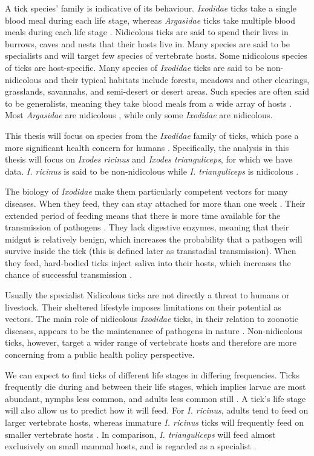 \documentclass{article}
\begin{document}
A tick species' family is indicative of its behaviour. \textit{Ixodidae} ticks take a single blood meal during each life stage, whereas \textit{Argasidae} ticks take multiple blood meals during each life stage \cite{Johnson2023d}. Nidicolous ticks are said to spend their lives in burrows, caves and nests that their hosts live in. Many species are said to be specialists and will target few species of vertebrate hosts. Some nidicolous species of ticks are host-specific. Many species of \textit{Ixodidae} ticks are said to be non-nidicolous and their typical habitats include forests, meadows and other clearings, grasslands, savannahs, and semi-desert or desert areas. Such species are often said to be generalists, meaning they take blood meals from a wide array of hosts \cite{Nicholson2019}. Most \textit{Argasidae} are nidicolous \cite{Vial2009}, while only some \textit{Ixodidae} are nidicolous. 

This thesis will focus on species from the \textit{Ixodidae} family of ticks, which pose a more significant health concern for humans \cite{Parola2001}. Specifically, the analysis in this thesis will focus on \textit{Ixodes ricinus} and \textit{Ixodes trianguliceps}, for which we have data. \textit{I. ricinus} is said to be non-nidicolous while \textit{I. trianguliceps} is nidicolous \cite{Nicholson2019}.

The biology of \textit{Ixodidae} make them particularly competent vectors for many diseases. When they feed, they can stay attached for more than one week \cite{Johnson2023b}. Their extended period of feeding means that there is more time available for the transmission of pathogens \cite{Gray2024}. They lack digestive enzymes, meaning that their midgut is relatively benign, which increases the probability that a pathogen will survive inside the tick (this is defined later as transtadial transmission). When they feed, hard-bodied ticks inject saliva into their hosts, which increases the chance of successful transmission \cite{Gray2024}.

Usually the specialist Nidicolous ticks are not directly a threat to humans or livestock. Their sheltered lifestyle imposes limitations on their potential as vectors. The main role of nidicolous \textit{Ixodidae} ticks, in their relation to zoonotic diseases, appears to be the maintenance of pathogens in nature \cite{gray2014}. Non-nidicolous ticks, however, target a wider range of vertebrate hosts and therefore are more concerning from a public health policy perspective.

We can expect to find ticks of different life stages in differing frequencies. Ticks frequently die during and between their life stages, which implies larvae are most abundant, nymphs less common, and adults less common still \cite{Randolph1998}. A tick's life stage will also allow us to predict how it will feed. For \textit{I. ricinus}, adults tend to feed on larger vertebrate hosts, whereas immature \textit{I. ricinus} ticks will frequently feed on smaller vertebrate hosts \cite{Herrmann2015, Randolph1998}. In comparison, \textit{I. trianguliceps} will feed almost exclusively on small mammal hosts, and is regarded as a specialist \cite{Bown2003, Bown2008}.
\end{document}
